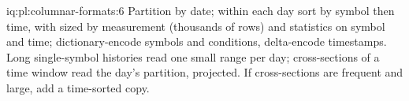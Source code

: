 \begin{solution}{iq:pl:columnar-formats:6}
Partition by date; within each day sort by symbol then time, with  sized by measurement (thousands of rows) and
statistics on symbol and time; dictionary-encode symbols and conditions, delta-encode timestamps. Long single-symbol histories
read one small range per day; cross-sections of a time window read the day's partition, projected. If cross-sections are
frequent and large, add a time-sorted copy.
\end{solution}
